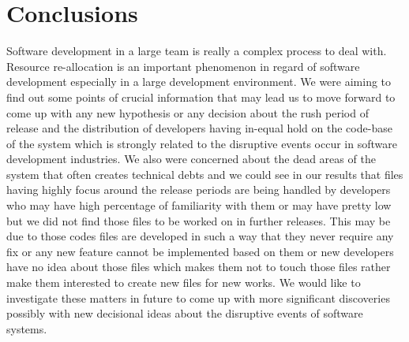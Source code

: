 \documentclass{acm_proc_article-sp}
\begin{document}
\section{Conclusions}
Software development in a large team is really a complex process to deal with. Resource re-allocation is an important phenomenon in regard of software development especially in a large development environment. We were aiming to find out some points of crucial information that may lead us to move forward to come up with any new hypothesis or any decision about the rush period of release and the distribution of developers having in-equal hold on the code-base of the system which is strongly related to the disruptive events occur in software development industries. We also were concerned about the dead areas of the system that often creates technical debts and we could see in our results that files having highly focus around the release periods are being handled by developers who may have high percentage of familiarity with them or may have pretty low but we did not find those files to be worked on in further releases. This may be due to those codes files are developed in such a way that they never require any fix or any new feature cannot be implemented based on them or new developers have no idea about those files which makes them not to touch those files rather make them interested to create new files for new works. We would like to investigate these matters in future to come up with more significant discoveries possibly with new decisional ideas about the disruptive events of software systems.



 

\balancecolumns
\end{document}

